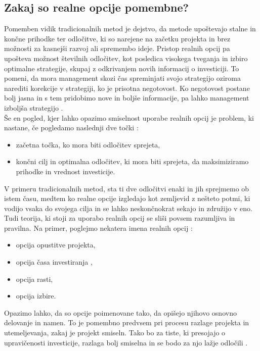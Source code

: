 \subsection{Zakaj so realne opcije pomembne?}
Pomemben vidik tradicionalnih metod je dejstvo, da metode upoštevajo stalne in končne prihodke ter odločitve, ki so narejene na začetku projekta in brez možnosti za kasnejši razvoj ali spremembo ideje. Pristop realnih opcij pa upošteva možnost številnih odločitev, kot posledica visokega tveganja in izbiro optimalne strategije, skupaj z odkrivanjem novih informacij o investiciji. To pomeni, da mora management skozi čas spreminjati svojo strategijo oziroma narediti korekcije v strategiji, ko je prisotna negotovost. Ko negotovost postane bolj jasna in s tem pridobimo nove in boljše informacije, pa lahko management izboljša strategijo \cite[str. 92]{Mun}. \\

Še en pogled, kjer lahko opazimo smiselnost uporabe realnih opcij je problem, ki nastane, če pogledamo naslednji dve točki \cite[str. 92]{Mun}:
\begin{itemize}
\item začetna točka, ko mora biti odločitev sprejeta,
\item končni cilj in optimalna odločitev, ki mora biti sprejeta, da maksimiziramo prihodke in vrednost investicije.
\end{itemize}
V primeru tradicionalnih metod, sta ti dve odločitvi enaki in jih sprejmemo ob istem času, medtem ko realne opcije izgledajo kot zemljevid z nešteto potmi, ki vodijo vsaka do svojega cilja in se lahko neskončnokrat sekajo in združijo v eno. \\

Tudi teorija, ki stoji za uporabo realnih opcij se sliši povsem razumljiva in pravilna. Na primer, poglejmo nekatera imena realnih opcij \cite[str. 93]{Mun}:
\begin{itemize}
\item opcija opustitve projekta,
\item opcija časa investiranja ,
\item opcija rasti,
\item opcija izbire.
\end{itemize}
Opazimo lahko, da so opcije poimenovane tako, da opišejo njihovo osnovno delovanje in namen. To je pomembno predvsem pri procesu razlage projekta in utemeljevanja, zakaj je projekt smiseln. Tako bo za tiste, ki presojajo o upravičenosti investicije, razlaga bolj smiselna in se bodo za njo lažje odločili \cite[str. 93]{Mun}. \\

